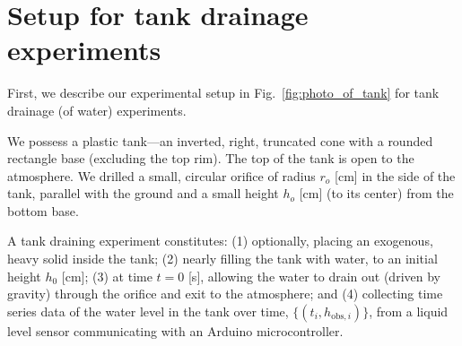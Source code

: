 \documentclass[a4paper,fleqn]{cas-dc}
\begin{document}



\section{Setup for tank drainage experiments} \label{sec:expt}
First, we describe our experimental setup in Fig.~\ref{fig:photo_of_tank} for tank drainage (of water) experiments.

We possess a plastic tank---an inverted, right, truncated cone with a rounded rectangle base (excluding the top rim). The top of the tank is open to the atmosphere.
We drilled a small, circular orifice of radius $r_o$ [cm] in the side of the tank, parallel with the ground and a small height $h_o$ [cm] (to its center) from the bottom base.



A tank draining experiment constitutes: 
(1) optionally, placing an exogenous, heavy solid inside the tank; 
(2) nearly filling the tank with water, to an initial height $h_0$ [cm]; 
(3) at time $t=0$ [s], allowing the water to drain out (driven by gravity) through the orifice and exit to the atmosphere; and 
(4) collecting time series data of the water level in the tank over time, $\{(t_i, h_{\text{obs}, i}) \}$, from a liquid level sensor communicating with an Arduino microcontroller. 
\end{document}

